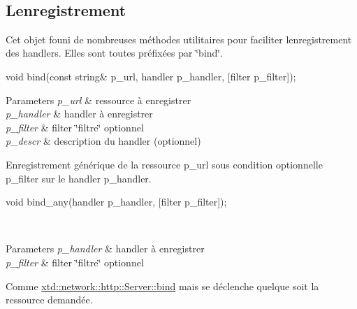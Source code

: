~\newline
 \subsection*{L\textquotesingle{}enregistrement }

Cet objet founi de nombreuses méthodes utilitaires pour faciliter l\textquotesingle{}enregistrement des handlers. Elles sont toutes préfixées par \char`\"{}bind\char`\"{}.


\begin{DoxyItemize}
\item 
\begin{DoxyCode}
\textcolor{keywordtype}{void} bind(\textcolor{keyword}{const} \textcolor{keywordtype}{string}& p\_url, handler p\_handler, [filter p\_filter]); 
\end{DoxyCode}
 
\begin{DoxyParams}{Parameters}
{\em p\+\_\+url} & ressource à enregistrer \\
\hline
{\em p\+\_\+handler} & handler à enregistrer \\
\hline
{\em p\+\_\+filter} & filter \char`\"{}filtre\char`\"{} optionnel \\
\hline
{\em p\+\_\+descr} & description du handler (optionnel)\\
\hline
\end{DoxyParams}
Enregistrement générique de la ressource p\+\_\+url sous condition optionnelle p\+\_\+filter sur le handler p\+\_\+handler. ~\newline
~\newline

\item 
\begin{DoxyCode}
\textcolor{keywordtype}{void} bind\_any(handler p\_handler, [filter p\_filter]); 
\end{DoxyCode}
 ~\newline
~\newline
 
\begin{DoxyParams}{Parameters}
{\em p\+\_\+handler} & handler à enregistrer \\
\hline
{\em p\+\_\+filter} & filter \char`\"{}filtre\char`\"{} optionnel\\
\hline
\end{DoxyParams}
Comme \hyperlink{classxtd_1_1network_1_1http_1_1Server_aa964ab0b0c3ba29238cb2aae49181537}{xtd\+::network\+::http\+::\+Server\+::bind} mais se déclenche quelque soit la ressource demandée. ~\newline
~\newline


\end{DoxyItemize}
